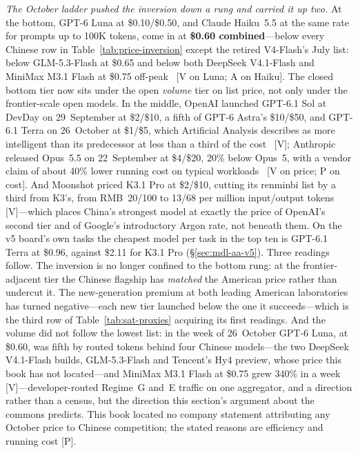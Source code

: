\emph{The October ladder pushed the inversion down a rung and carried it up two.} At the bottom, GPT-6 Luna at \$0.10/\$0.50, and Claude Haiku~5.5 at the same rate for prompts up to 100K tokens, come in at \textbf{\$0.60 combined}---below every Chinese row in Table~\ref{tab:price-inversion} except the retired V4-Flash's July list: below GLM-5.3-Flash at \$0.65 and below both DeepSeek V4.1-Flash and MiniMax M3.1 Flash at \$0.75 off-peak~\cite{mdl-openai-ladder,mdl-cleus-oct26} [V on Luna; A on Haiku]. The closed bottom tier now sits under the open \emph{volume} tier on list price, not only under the frontier-scale open models. In the middle, OpenAI launched GPT-6.1 Sol at DevDay on 29~September at \$2/\$10, a fifth of GPT-6 Astra's \$10/\$50, and GPT-6.1 Terra on 26~October at \$1/\$5, which Artificial Analysis describes as more intelligent than its predecessor at less than a third of the cost~\cite{mdl-gpt61-sol,mdl-gpt61-terra} [V]; Anthropic released Opus~5.5 on 22~September at \$4/\$20, 20\% below Opus~5, with a vendor claim of about 40\% lower running cost on typical workloads~\cite{mdl-opus55} [V on price; P on cost]. And Moonshot priced K3.1 Pro at \$2/\$10, cutting its renminbi list by a third from K3's, from RMB~20/100 to 13/68 per million input/output tokens~\cite{mdl-kimi-k31} [V]---which places China's strongest model at exactly the price of OpenAI's second tier and of Google's introductory Argon rate, not beneath them. On the v5 board's own tasks the cheapest model per task in the top ten is GPT-6.1 Terra at \$0.96, against \$2.11 for K3.1 Pro (\S\ref{sec:mdl-aa-v5}). Three readings follow. The inversion is no longer confined to the bottom rung: at the frontier-adjacent tier the Chinese flagship has \emph{matched} the American price rather than undercut it. The new-generation premium at both leading American laboratories has turned negative---each new tier launched below the one it succeeds---which is the third row of Table~\ref{tab:sat-proxies} acquiring its first readings. And the volume did not follow the lowest list: in the week of 26~October GPT-6 Luna, at \$0.60, was fifth by routed tokens behind four Chinese models---the two DeepSeek V4.1-Flash builds, GLM-5.3-Flash and Tencent's Hy4 preview, whose price this book has not located---and MiniMax M3.1 Flash at \$0.75 grew 340\% in a week~\cite{mdl-openrouter-oct26} [V]---developer-routed Regime~G and~E traffic on one aggregator, and a direction rather than a census, but the direction this section's argument about the commons predicts. This book located no company statement attributing any October price to Chinese competition; the stated reasons are efficiency and running cost [P].

